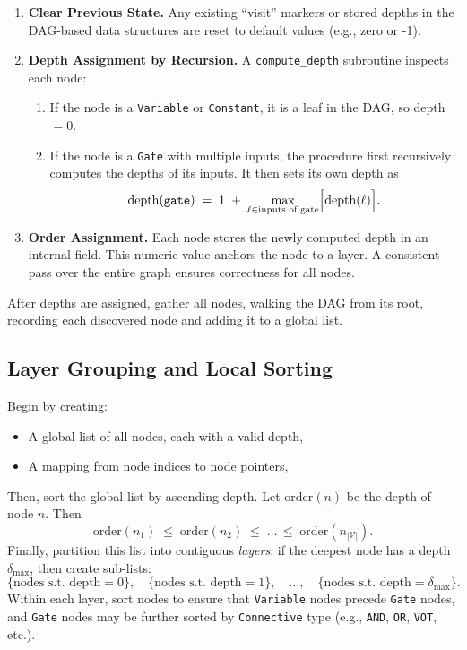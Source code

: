\begin{enumerate}
    \item \textbf{Clear Previous State.}  
      Any existing “visit” markers or stored depths in the DAG-based data structures are reset to default values (e.g., zero or -1).
      
    \item \textbf{Depth Assignment by Recursion.}  
      A \texttt{compute\_depth} subroutine inspects each node:
      \begin{enumerate}
        \item If the node is a \texttt{Variable} or \texttt{Constant}, it is a leaf in the DAG, so depth \(=0\).  
        \item If the node is a \texttt{Gate} with multiple inputs, the procedure first recursively computes the depths of its inputs. It then sets its own depth as 
        \[
          \text{depth}(\texttt{gate})
          \;=\;
          1 \;+\;\max\limits_{\ell \in \text{inputs of gate}} \Bigl[\text{depth}(\ell)\Bigr].
        \]
      \end{enumerate}
    \item \textbf{Order Assignment.}  
      Each node stores the newly computed depth in an internal field. This numeric value anchors the node to a layer. A consistent pass over the entire graph ensures correctness for all nodes.
\end{enumerate}

After depths are assigned, gather all nodes, walking the DAG from its root, recording each discovered node and adding it to a global list.

\subsection{Layer Grouping and Local Sorting}

Begin by creating:
\begin{itemize}
\item A global list of all nodes, each with a valid depth,  
\item A mapping from node indices to node pointers,  
\end{itemize}
Then, sort the global list by ascending depth.  Let \(\text{order}(n)\) be the depth of node \(n\).  Then
\[
\text{order}(n_1)\;\le\;\text{order}(n_2)\;\le\;\dots\,\le\;\text{order}(n_{|\mathcal{V}|}).
\]
Finally, partition this list into contiguous \emph{layers}: if the deepest node has a depth \(\delta_{\max}\), then create sub-lists:
\[
\{\text{nodes s.t. depth}=0\},
\quad
\{\text{nodes s.t. depth}=1\},
\quad
\dots,
\quad
\{\text{nodes s.t. depth}=\delta_{\max}\}.
\]
Within each layer, sort nodes to ensure that \texttt{Variable} nodes precede \texttt{Gate} nodes, and \texttt{Gate} nodes may be further sorted by \texttt{Connective} type (e.g., \texttt{AND}, \texttt{OR}, \texttt{VOT}, etc.).


